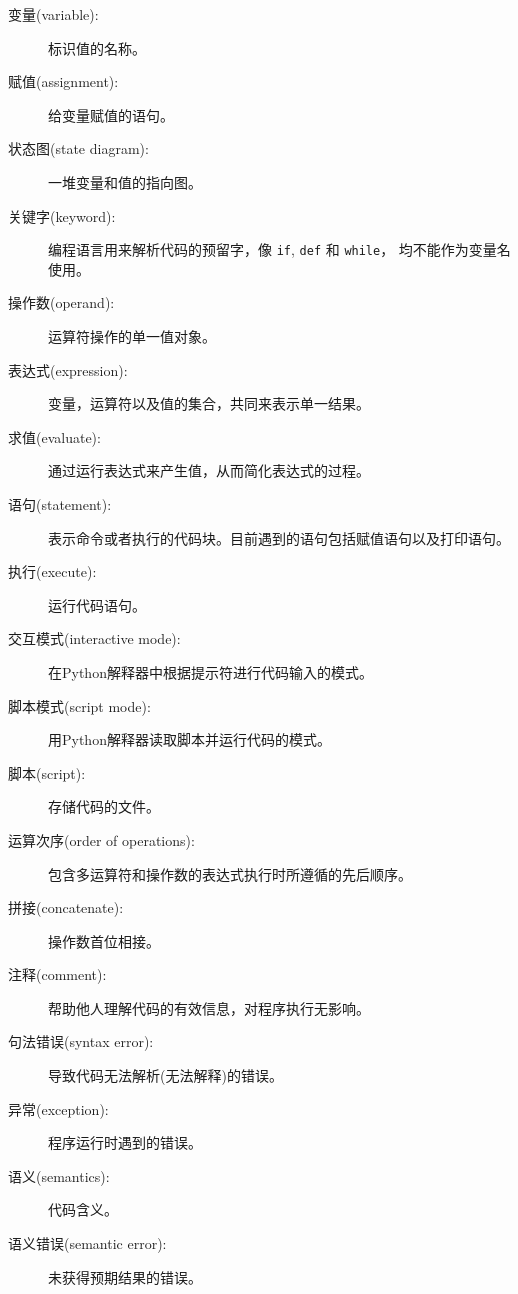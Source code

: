 \documentclass[10pt]{book}
\begin{document}
\begin{description}

\item[变量(variable):]  标识值的名称。

\item[赋值(assignment):]  给变量赋值的语句。

\item[状态图(state diagram):]  一堆变量和值的指向图。

\item[关键字(keyword):]  编程语言用来解析代码的预留字，像 {\tt if}, {\tt  def} 和 {\tt while}，
均不能作为变量名使用。

\item[操作数(operand):]  运算符操作的单一值对象。

\item[表达式(expression):]  变量，运算符以及值的集合，共同来表示单一结果。

\item[求值(evaluate):]  通过运行表达式来产生值，从而简化表达式的过程。

\item[语句(statement):]  表示命令或者执行的代码块。目前遇到的语句包括赋值语句以及打印语句。

\item[执行(execute):]  运行代码语句。

\item[交互模式(interactive mode):] 在Python解释器中根据提示符进行代码输入的模式。

\item[脚本模式(script mode):] 用Python解释器读取脚本并运行代码的模式。

\item[脚本(script):] 存储代码的文件。

\item[运算次序(order of operations):]  包含多运算符和操作数的表达式执行时所遵循的先后顺序。

\item[拼接(concatenate):]  操作数首位相接。

\item[注释(comment):]  帮助他人理解代码的有效信息，对程序执行无影响。

\item[句法错误(syntax error):] 导致代码无法解析(无法解释)的错误。

\item[异常(exception):]  程序运行时遇到的错误。

\item[语义(semantics):]  代码含义。

\item[语义错误(semantic error):]   未获得预期结果的错误。

\end{description}
\end{document}
